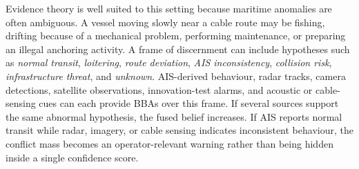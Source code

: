 \documentclass[graybox,envcountchap]{style/SNmono}
\begin{document}
Evidence theory is well suited to this setting because maritime anomalies are often ambiguous. A vessel moving slowly near a cable route may be fishing, drifting because of a mechanical problem, performing maintenance, or preparing an illegal anchoring activity. A frame of discernment can include hypotheses such as \emph{normal transit}, \emph{loitering}, \emph{route deviation}, \emph{AIS inconsistency}, \emph{collision risk}, \emph{infrastructure threat}, and \emph{unknown}. AIS-derived behaviour, radar tracks, camera detections, satellite observations, innovation-test alarms, and acoustic or cable-sensing cues can each provide BBAs over this frame. If several sources support the same abnormal hypothesis, the fused belief increases. If AIS reports normal transit while radar, imagery, or cable sensing indicates inconsistent behaviour, the conflict mass becomes an operator-relevant warning rather than being hidden inside a single confidence score.
\end{document}
